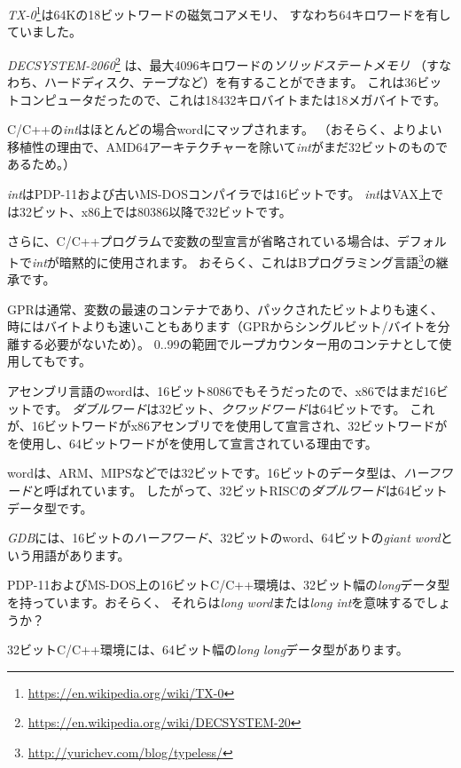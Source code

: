 \emph{TX-0}\footnote{\url{https://en.wikipedia.org/wiki/TX-0}}は64Kの18ビットワードの磁気コアメモリ、
すなわち64キロワードを有していました。

\emph{DECSYSTEM-2060}\footnote{\url{https://en.wikipedia.org/wiki/DECSYSTEM-20}}
は、最大4096キロワードの\emph{ソリッドステートメモリ}
（すなわち、ハードディスク、テープなど）を有することができます。
これは36ビットコンピュータだったので、これは18432キロバイトまたは18メガバイトです。

\myhrule{}

C/C++の\emph{int}はほとんどの場合\gls{word}にマップされます。
（おそらく、よりよい移植性の理由で、AMD64アーキテクチャーを除いて\emph{int}がまだ32ビットのものであるため。）

\emph{int}はPDP-11および古いMS-DOSコンパイラでは16ビットです。 
\emph{int}はVAX上では32ビット、x86上では80386以降で32ビットです。

さらに、C/C++プログラムで変数の型宣言が省略されている場合は、デフォルトで\emph{int}が暗黙的に使用されます。
おそらく、これはBプログラミング言語\footnote{\url{http://yurichev.com/blog/typeless/}}の継承です。

\myhrule{}

\ac{GPR}は通常、変数の最速のコンテナであり、パックされたビットよりも速く、
時にはバイトよりも速いこともあります（GPRからシングルビット/バイトを分離する必要がないため）。 
0..99の範囲でループカウンター用のコンテナとして使用してもです。

\myhrule{}

アセンブリ言語の\Gls{word}は、16ビット8086でもそうだったので、x86ではまだ16ビットです。
\emph{ダブルワード}は32ビット、\emph{クワッドワード}は64ビットです。 
これが、16ビットワードがx86アセンブリでを使用して宣言され、32ビットワードがを使用し、64ビットワードがを使用して宣言されている理由です。

\Gls{word}は、ARM、MIPSなどでは32ビットです。16ビットのデータ型は、\emph{ハーフワード}と呼ばれています。 
したがって、32ビットRISCの\emph{ダブルワード}は64ビットデータ型です。

\emph{GDB}には、16ビットの\emph{ハーフワード}、32ビットの\gls{word}、64ビットの\emph{giant word}という用語があります。

PDP-11およびMS-DOS上の16ビットC/C++環境は、32ビット幅の\emph{long}データ型を持っています。おそらく、
それらは\emph{long word}または\emph{long int}を意味するでしょうか？

32ビットC/C++環境には、64ビット幅の\emph{long long}データ型があります。

